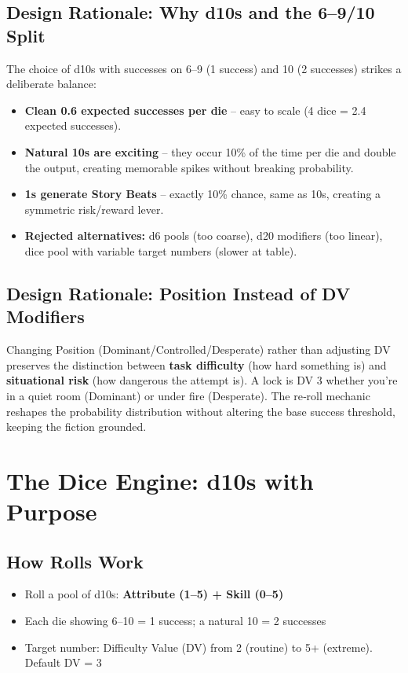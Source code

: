 \documentclass[11pt]{article}
\begin{document}
\subsection{Design Rationale: Why d10s and the 6–9/10 Split}
\label{sec:why-d10}
The choice of d10s with successes on 6–9 (1 success) and 10 (2 successes) strikes a deliberate balance:
\begin{itemize}
    \item \textbf{Clean 0.6 expected successes per die} – easy to scale (4 dice = 2.4 expected successes).
    \item \textbf{Natural 10s are exciting} – they occur 10\% of the time per die and double the output, creating memorable spikes without breaking probability.
    \item \textbf{1s generate Story Beats} – exactly 10\% chance, same as 10s, creating a symmetric risk/reward lever.
    \item \textbf{Rejected alternatives:} d6 pools (too coarse), d20 modifiers (too linear), dice pool with variable target numbers (slower at table).
\end{itemize}

\subsection{Design Rationale: Position Instead of DV Modifiers}
\label{sec:why-position}
Changing Position (Dominant/Controlled/Desperate) rather than adjusting DV preserves the distinction between \textbf{task difficulty} (how hard something is) and \textbf{situational risk} (how dangerous the attempt is). A lock is DV 3 whether you're in a quiet room (Dominant) or under fire (Desperate). The re‑roll mechanic reshapes the probability distribution without altering the base success threshold, keeping the fiction grounded.

\section{The Dice Engine: d10s with Purpose}

\subsection{How Rolls Work}
\begin{itemize}
    \item Roll a pool of d10s: \textbf{Attribute (1–5) + Skill (0–5)}
    \item Each die showing 6–10 = 1 success; a natural 10 = 2 successes
    \item Target number: Difficulty Value (DV) from 2 (routine) to 5+ (extreme). Default DV = 3
\end{itemize}
\end{document}
